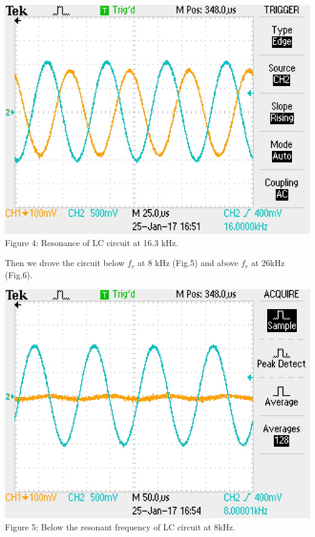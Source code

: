 \documentclass[]{article}
\begin{document}
\begin{center}
	\includegraphics[scale=0.8]{b_resonance}\\
	Figure 4: Resonance of LC circuit at 16.3 kHz.
\end{center}
Then we drove the circuit below $f_{r}$ at 8 kHz (Fig.5) and above $f_{r}$ at 26kHz (Fig.6).
\begin{center}
	\includegraphics[scale=0.8]{b_8Hz}\\
	Figure 5: Below the resonant frequency of LC circuit at 8kHz.
\end{center}
\end{document}
